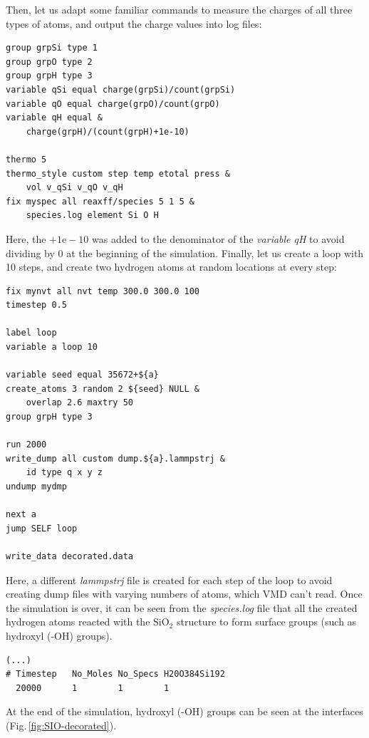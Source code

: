 \documentclass[9pt,tutorial]{livecoms}
\begin{document}
Then, let us adapt some familiar commands to measure the charges of all three
types of atoms, and output the charge values into log files:
{\normalsize \begin{verbatim}
group grpSi type 1
group grpO type 2
group grpH type 3
variable qSi equal charge(grpSi)/count(grpSi)
variable qO equal charge(grpO)/count(grpO)
variable qH equal &
    charge(grpH)/(count(grpH)+1e-10)

thermo 5
thermo_style custom step temp etotal press &
    vol v_qSi v_qO v_qH
fix myspec all reaxff/species 5 1 5 &
    species.log element Si O H
\end{verbatim}}
Here, the $+1\text{e}-10$ was added to the denominator of the \textit{variable qH}
to avoid dividing by 0 at the beginning of the simulation. Finally, let us
create a loop with 10 steps, and create two hydrogen atoms at random locations at
every step:
{\normalsize \begin{verbatim}
fix mynvt all nvt temp 300.0 300.0 100
timestep 0.5

label loop
variable a loop 10

variable seed equal 35672+${a}
create_atoms 3 random 2 ${seed} NULL &
    overlap 2.6 maxtry 50
group grpH type 3

run 2000
write_dump all custom dump.${a}.lammpstrj &
    id type q x y z
undump mydmp

next a
jump SELF loop

write_data decorated.data
\end{verbatim}}
Here, a different \textit{lammpstrj} file is created for each step of the loop
to avoid creating dump files with varying numbers of atoms, which VMD can't read.
Once the simulation is over, it can be seen from the \textit{species.log} file that
all the created hydrogen atoms reacted with the $\text{SiO}_{2}$ structure to
form surface groups (such as hydroxyl (-OH) groups).
{\normalsize \begin{verbatim}
(...)
# Timestep   No_Moles No_Specs H20O384Si192
  20000      1        1        1
\end{verbatim}}
At the end of the simulation, hydroxyl (-OH) groups can be seen at the interfaces
(Fig.\,\ref{fig:SIO-decorated}).
\end{document}
